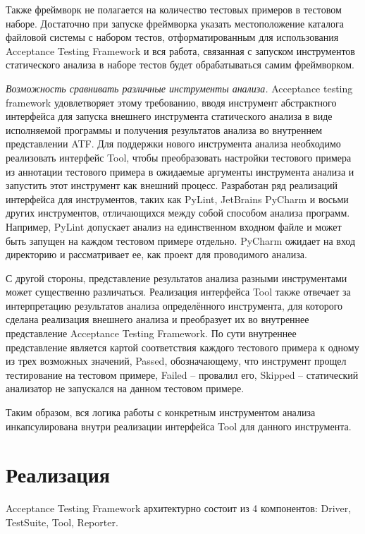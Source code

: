Также фреймворк не полагается на количество тестовых примеров в тестовом наборе.
Достаточно при запуске фреймворка указать местоположение каталога файловой системы с набором тестов, отформатированным для использования Acceptance Testing
Framework и вся работа, связанная с запуском инструментов статического анализа в наборе тестов будет обрабатываться самим фреймворком.

\textit{Возможность сравнивать различные инструменты анализа.} Acceptance
testing framework удовлетворяет этому требованию, вводя инструмент абстрактного интерфейса для запуска внешнего инструмента статического анализа в виде исполняемой
программы и получения результатов анализа во внутреннем представлении ATF.
Для поддержки нового инструмента анализа необходимо
реализовать интерфейс Tool, чтобы преобразовать настройки тестового примера
из аннотации тестового примера в ожидаемые аргументы инструмента анализа
и запустить этот инструмент как внешний процесс. Разработан ряд реализаций
интерфейса для инструментов, таких как PyLint, JetBrains PyCharm и восьми других инструментов, отличающихся между собой способом анализа программ. Например,
PyLint допускает анализ на единственном входном файле и может быть запущен
на каждом тестовом примере отдельно. PyCharm ожидает на вход директорию и
рассматривает ее, как проект для проводимого анализа. 

С другой стороны, представление результатов анализа разными инструментами может существенно различаться. Реализация интерфейса Tool также
отвечает за интерпретацию результатов анализа определённого инструмента, для которого сделана реализация внешнего анализа и преобразует их
во внутреннее представление Acceptance Testing Framework. 
По сути внутреннее представление является картой соответствия каждого тестового примера к одному из трех возможных значений, Passed, обозначающему, что инструмент прощел тестирование на тестовом примере, Failed -- провалил его, Skipped -- статический анализатор не запускался на данном тестовом примере. 

Таким образом, вся логика работы с конкретным инструментом анализа инкапсулирована внутри реализации интерфейса Tool для данного инструмента.

\section{Реализация}\label{sec:ch3/sect2}

Acceptance Testing Framework архитектурно состоит из 4 компонентов:
Driver, TestSuite, Tool, Reporter.


